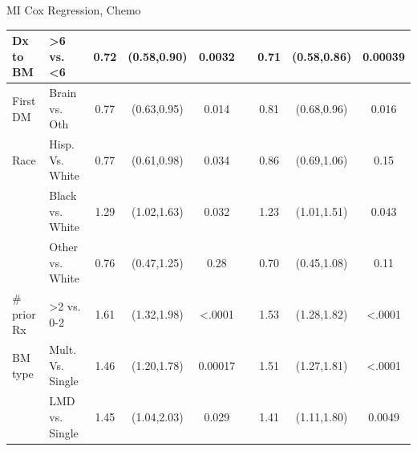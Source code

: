 \begin{frame}{MI Cox Regression, Chemo}
\begin{table}[]
{\begin{tabular}{|l|l|c|c|c|c|c|c|c|}
Dx to BM                       & \textgreater 6 vs. \textless 6   & 0.72                                                & (0.58,0.90)           & 0.0032                &                       & 0.71                  & (0.58,0.86) & 0.00039                                                     \\ \hline
First DM                       & Brain vs. Oth                    & 0.77                                                & (0.63,0.95)           & 0.014                 &                       & 0.81                  & (0.68,0.96) & 0.016                                                       \\ \hline
Race                           & Hisp. Vs. White                  & 0.77                                                & (0.61,0.98)           & 0.034                 &                       & 0.86                  & (0.69,1.06) & 0.15                                                        \\ \hline
                               & Black vs. White                  & 1.29                                                & (1.02,1.63)           & 0.032                 &                       & 1.23                  & (1.01,1.51) & 0.043                                                       \\ \hline
                               & Other vs. White                  & 0.76                                                & (0.47,1.25)           & 0.28                  &                       & 0.70                   & (0.45,1.08) & 0.11                                                        \\ \hline
\# prior Rx                    & \textgreater2 vs. 0-2            & 1.61                                                & (1.32,1.98)           & \textless .0001       &                       & 1.53                  & (1.28,1.82) & \textless .0001                                             \\ \hline
BM type                        & Mult. Vs. Single                 & 1.46                                                & (1.20,1.78)           & 0.00017               &                       & 1.51                  & (1.27,1.81) & \textless .0001                                             \\ \hline
                               & LMD vs. Single                   & 1.45                                                & (1.04,2.03)           & 0.029                 &                       & 1.41                  & (1.11,1.80) & 0.0049                                                      \\ \hline

\end{tabular}}
\end{table}
\end{frame}
